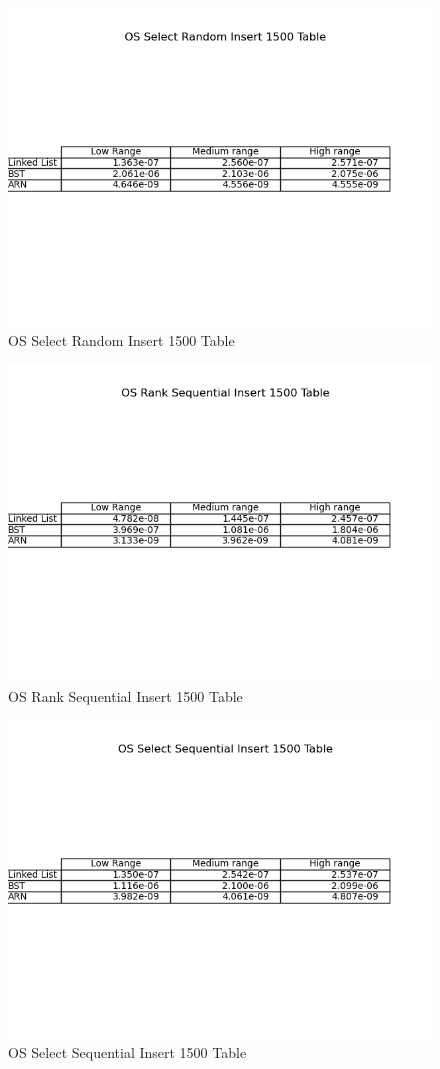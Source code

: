 \documentclass[11pt]{article}
\begin{document}
 \begin{figure}[H]
  \centering
  \includegraphics[width=0.8\linewidth]{Images/1500/OS Select Random Insert 1500 Table.png}
  \caption{OS Select Random Insert 1500 Table }
  \label{fig:OS Select Random Insert 1500 Table}
\end{figure}
 \begin{figure}[H]
  \centering
  \includegraphics[width=0.8\linewidth]{Images/1500/OS Rank Sequential Insert 1500 Table.png}
  \caption{OS Rank Sequential Insert 1500 Table }
  \label{fig:OS Rank Sequential Insert 1500 Table}
\end{figure}
 \begin{figure}[H]
  \centering
  \includegraphics[width=0.8\linewidth]{Images/1500/OS Select Sequential Insert 1500 Table.png}
  \caption{OS Select Sequential Insert 1500 Table }
  \label{fig:OS Select Sequential Insert 1500 Table}
\end{figure}
\end{document}
